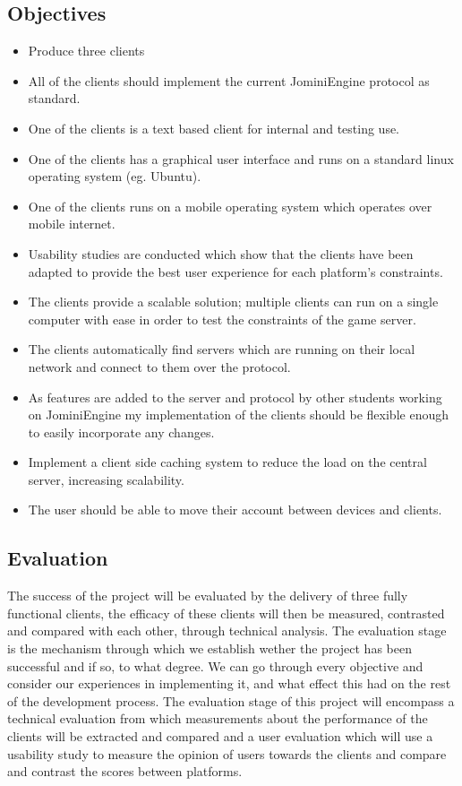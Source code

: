\documentclass{article}
\begin{document}
	\subsection{Objectives}
	\begin{itemize}
	\item Produce three clients
	\item All of the clients should implement the current JominiEngine protocol as standard.
	\item One of the clients is a text based client for internal and testing use.
	\item One of the clients has a graphical user interface and runs on a standard linux operating system (eg. Ubuntu).
	\item One of the clients runs on a mobile operating system which operates over mobile internet.
	\item Usability studies are conducted which show that the clients have been adapted to provide the best user experience for each platform’s constraints.
	\item The clients provide a scalable solution; multiple clients can run on a single computer with ease in order to test the constraints of the game server.
	\item The clients automatically find servers which are running on their local network and connect to them over the protocol. 
	\item As features are added to the server and protocol by other students working on JominiEngine my implementation of the clients should be flexible enough to easily incorporate any changes.
	\item Implement a client side caching system to reduce the load on the central server, increasing scalability.
	\item The user should be able to move their account between devices and clients.
\end{itemize}
	\subsection{Evaluation}
	The success of the project will be evaluated by the delivery of three fully functional clients, the efficacy of these clients will then be measured, contrasted and compared with each other, through technical analysis. The evaluation stage is the mechanism through which we establish wether the project has been successful and if so, to what degree. We can go through every objective and consider our experiences in implementing it, and what effect this had on the rest of the development process. The evaluation stage of this project will encompass a technical evaluation from which measurements about the performance of the clients will be extracted and compared and a user evaluation which will use a usability study to measure the opinion of users towards the clients and compare and contrast the scores between platforms. 
\end{document}

